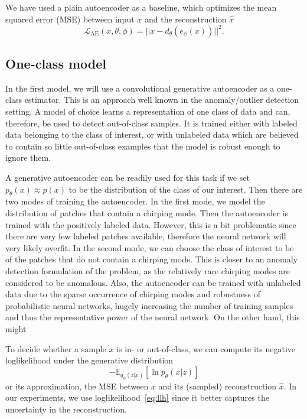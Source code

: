 We have used a plain autoencoder\cite{vincent2010stacked} as a baseline, which optimizes the mean squared error (MSE) between input $x$ and the reconstruction $\hat{x}$
\begin{equation}
  \mathcal{L}_{\text{AE}}(x,\theta,\phi) = || x - d_{\theta}(e_{\phi}(x)) ||^2.
\end{equation}

\subsection{One-class model}
In the first model, we will use a convolutional generative autoencoder as a one-class estimator. This is an approach well known in the anomaly/outlier detection setting\cite{chandola2009anomaly,scholkopf2001estimating}. A model of choice learns a representation of one class of data and can, therefore, be used to detect out-of-class samples. It is trained either with labeled data belonging to the class of interest, or with unlabeled data which are believed to contain so little out-of-class examples that the model is robust enough to ignore them. 

A generative autoencoder can be readily used for this task if we set $p_{\theta}(x) \approx p(x)$ to be the distribution of the class of our interest. Then there are two modes of training the autoencoder. In the first mode, we model the distribution of patches that contain a chirping mode. Then the autoencoder is trained with the positively labeled data. However, this is a bit problematic since there are very few labeled patches available, therefore the neural network will very likely overfit. In the second mode, we can choose the class of interest to be of the patches that do not contain a chirping mode. This is closer to an anomaly detection formulation of the problem, as the relatively rare chirping modes are considered to be anomalous. Also, the autoencoder can be trained with unlabeled data due to the sparse occurrence of chirping modes and robustness of probabilistic neural networks\cite{an2015variational,leveau2017adversarial}, hugely increasing the number of training samples and thus the representative power of the neural network. On the other hand, this might

To decide whether a sample $x$ is in- or out-of-class, we can compute its negative loglikelihood under the generative distribution 
\begin{equation} \label{eq:llh}
  -\mathbb{E}_{q_{\phi}(z|x)}\left[\ln p_{\theta}(x|z)\right]
\end{equation}
or its approximation, the MSE between $x$ and its (sampled) reconstruction $\hat{x}$. In our experiments, we use loglikelihood~\eqref{eq:llh} since it better captures the uncertainty in the reconstruction.

